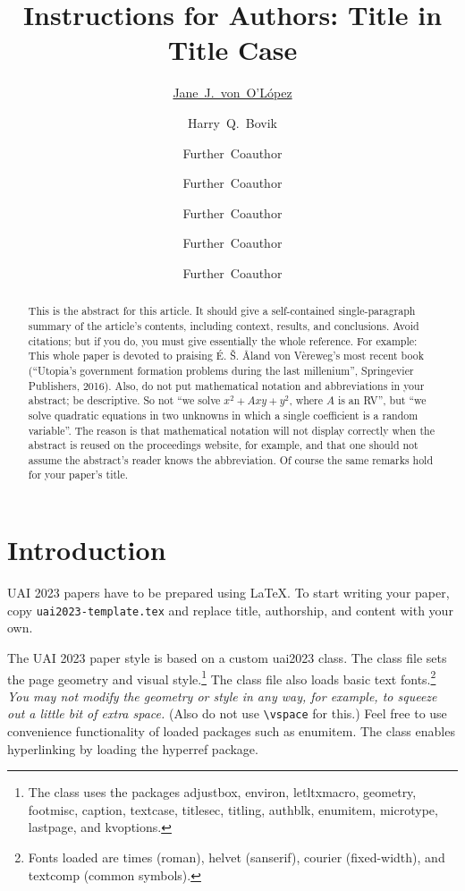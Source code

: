\documentclass{uai2023} %
\title{Instructions for Authors: Title in Title Case}
\author[1]{\href{mailto:<jj@example.edu>?Subject=Your UAI 2023 paper}{Jane~J.~von~O'L\'opez}{}}
\author[1]{Harry~Q.~Bovik}
\author[1,2]{Further~Coauthor}
\author[3]{Further~Coauthor}
\author[1]{Further~Coauthor}
\author[3]{Further~Coauthor}
\author[3,1]{Further~Coauthor}
\affil[1]{%
    Computer Science Dept.\\
    Cranberry University\\
    Pittsburgh, Pennsylvania, USA
}
\affil[2]{%
    Second Affiliation\\
    Address\\
    …
}
\affil[3]{%
    Another Affiliation\\
    Address\\
    …
  }
\begin{document}
\maketitle

\begin{abstract}
  This is the abstract for this article.
  It should give a self-contained single-paragraph summary of the article's contents, including context, results, and conclusions.
  Avoid citations; but if you do, you must give essentially the whole reference.
  For example: This whole paper is devoted to praising É. Š. Åland von Vèreweg's most recent book (“Utopia's government formation problems during the last millenium”, Springevier Publishers, 2016).
  Also, do not put mathematical notation and abbreviations in your abstract; be descriptive.
  So not “we solve \(x^2+A xy+y^2\), where \(A\) is an RV”, but “we solve quadratic equations in two unknowns in which a single coefficient is a random variable”.
  The reason is that mathematical notation will not display correctly when the abstract is reused on the proceedings website, for example, and that one should not assume the abstract's reader knows the abbreviation.
  Of course the same remarks hold for your paper's title.
\end{abstract}

\section{Introduction}\label{sec:intro}
UAI 2023 papers have to be prepared using \LaTeX.
To start writing your paper, copy \texttt{uai2023-template.tex} and replace title, authorship, and content with your own.

The UAI 2023 paper style is based on a custom \textsf{uai2023} class.
The class file sets the page geometry and visual style.\footnote{%
    The class uses the packages \textsf{adjustbox}, \textsf{environ}, \textsf{letltxmacro}, \textsf{geometry}, \textsf{footmisc}, \textsf{caption}, \textsf{textcase}, \textsf{titlesec}, \textsf{titling}, \textsf{authblk}, \textsf{enumitem}, \textsf{microtype}, \textsf{lastpage}, and \textsf{kvoptions}.
}
The class file also loads basic text fonts.\footnote{%
    Fonts loaded are \textsf{times} (roman), \textsf{helvet} (sanserif), \textsf{courier} (fixed-width), and \textsf{textcomp} (common symbols).
}
\emph{You may not modify the geometry or style in any way, for example, to squeeze out a little bit of extra space.}
(Also do not use \verb|\vspace| for this.)
Feel free to use convenience functionality of loaded packages such as \textsf{enumitem}.
The class enables hyperlinking by loading the \textsf{hyperref} package.
\end{document}
